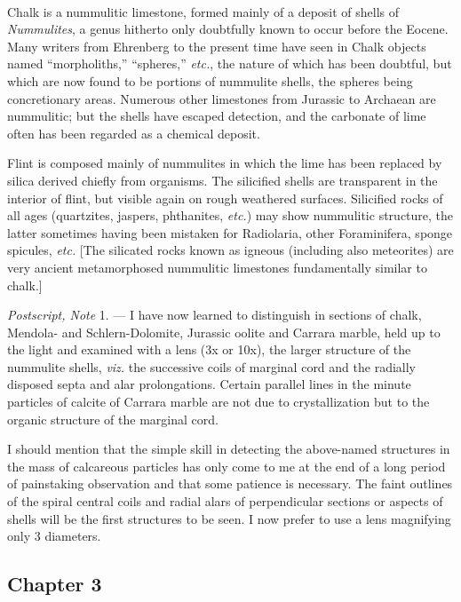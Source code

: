 \documentclass[a4paper, 12pt, oneside]{article}
\begin{document}
\paragraph{}
Chalk is a nummulitic limestone, formed mainly of a deposit of shells of \emph{Nummulites}, a genus hitherto only doubtfully known to occur before the Eocene. Many writers from Ehrenberg to the present time have seen in Chalk objects named ``morpholiths,'' ``spheres,'' \emph{etc.}, the nature of which has been doubtful, but which are now found to be portions of nummulite shells, the spheres being concretionary areas. Numerous other limestones from Jurassic to Archaean are nummulitic; but the shells have escaped detection, and the carbonate of lime often has been regarded as a chemical deposit.

Flint is composed mainly of nummulites in which the lime has been replaced by silica derived chiefly from organisms. The silicified shells are transparent in the interior of flint, but visible again on rough weathered surfaces. Silicified rocks of all ages (quartzites, jaspers, phthanites, \emph{etc.}) may show nummulitic structure, the latter sometimes having been mistaken for Radiolaria, other Foraminifera, sponge spicules, \emph{etc.} [The silicated rocks known as igneous (including also meteorites) are very ancient metamorphosed nummulitic limestones fundamentally similar to chalk.]

\emph{Postscript, Note} 1. --- I have now learned to distinguish in sections of chalk, Mendola- and Schlern-Dolomite, Jurassic oolite and Carrara marble, held up to the light and examined with a lens (3x or 10x), the larger structure of the nummulite shells, \emph{viz.} the successive coils of marginal cord and the radially disposed septa and alar prolongations. Certain parallel lines in the minute particles of calcite of Carrara marble are not due to crystallization but to the organic structure of the marginal cord.

I should mention that the simple skill in detecting the above-named structures in the mass of calcareous particles has only come to me at the end of a long period of painstaking observation and that some patience is necessary. The faint outlines of the spiral central coils and radial alars of perpendicular sections or aspects of shells will be the first structures to be seen. I now prefer to use a lens magnifying only 3 diameters.
\clearpage
\subsection{Chapter 3}
\end{document}
